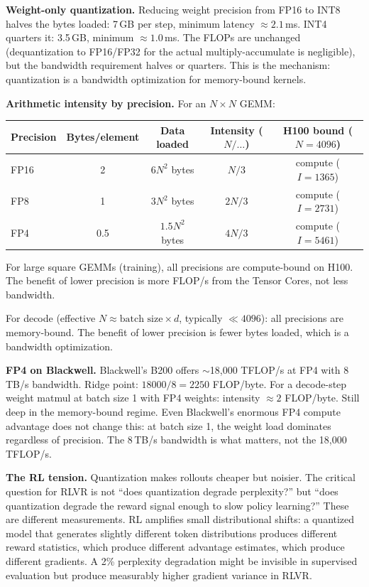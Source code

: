 \textbf{Weight-only quantization.} Reducing weight precision from FP16 to INT8 halves the bytes loaded: 7\,GB per step, minimum latency $\approx 2.1$\,ms. INT4 quarters it: 3.5\,GB, minimum $\approx 1.0$\,ms. The FLOPs are unchanged (dequantization to FP16/FP32 for the actual multiply-accumulate is negligible), but the bandwidth requirement halves or quarters. This is the mechanism: quantization is a bandwidth optimization for memory-bound kernels.

\textbf{Arithmetic intensity by precision.} For an $N \times N$ GEMM:

\begin{center}
\small
\begin{tabular}{@{}lcccc@{}}
\toprule
\textbf{Precision} & \textbf{Bytes/element} & \textbf{Data loaded} & \textbf{Intensity ($N/\ldots$)} & \textbf{H100 bound ($N=4096$)} \\
\midrule
FP16  & 2 & $6N^2$ bytes & $N/3$ & compute ($I = 1365$) \\
FP8   & 1 & $3N^2$ bytes & $2N/3$ & compute ($I = 2731$) \\
FP4   & 0.5 & $1.5N^2$ bytes & $4N/3$ & compute ($I = 5461$) \\
\bottomrule
\end{tabular}
\end{center}

\smallskip
For large square GEMMs (training), all precisions are compute-bound on H100. The benefit of lower precision is more FLOP/s from the Tensor Cores, not less bandwidth.

For decode (effective $N \approx \text{batch size} \times d$, typically $\ll 4096$): all precisions are memory-bound. The benefit of lower precision is fewer bytes loaded, which is a bandwidth optimization.

\textbf{FP4 on Blackwell.} Blackwell's B200 offers $\sim$18,000 TFLOP/s at FP4 with 8\,TB/s bandwidth. Ridge point: $18000 / 8 = 2250$ FLOP/byte. For a decode-step weight matmul at batch size 1 with FP4 weights: intensity $\approx 2$ FLOP/byte. Still deep in the memory-bound regime. Even Blackwell's enormous FP4 compute advantage does not change this: at batch size 1, the weight load dominates regardless of precision. The 8\,TB/s bandwidth is what matters, not the 18,000 TFLOP/s.

\textbf{The RL tension.} Quantization makes rollouts cheaper but noisier. The critical question for RLVR is not ``does quantization degrade perplexity?'' but ``does quantization degrade the reward signal enough to slow policy learning?'' These are different measurements. RL amplifies small distributional shifts: a quantized model that generates slightly different token distributions produces different reward statistics, which produce different advantage estimates, which produce different gradients. A 2\% perplexity degradation might be invisible in supervised evaluation but produce measurably higher gradient variance in RLVR.

